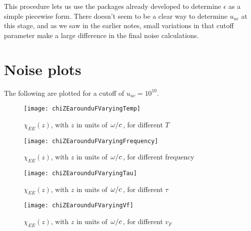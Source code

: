 \documentclass[11pt]{article}
\begin{document}
	This procedure lets us use the packages already developed to determine $\epsilon$ as a simple piecewise form.
	There doesn't seem to be a clear way to determine $u_{uc}$ at this stage, and as we saw in the earlier notes, small variations in that cutoff parameter make a large difference in the final noise calculations.

	\section{Noise plots} \label{sec:plots}

	The following are plotted for a cutoff of $u_{uc} = 10^{10}$.

	\begin{figure}[htp]
		\centering
		\texttt{[image: chiZEarounduFVaryingTemp]}
		\caption{$\chi_{EE}(z)$, with $z$ in units of $\flatfrac{\omega}{c}$, for different $T$} \label{fig:temp}
	\end{figure}

	\begin{figure}[htp]
		\centering
		\texttt{[image: chiZEarounduFVaryingFrequency]}
		\caption{$\chi_{EE}(z)$, with $z$ in units of $\flatfrac{\omega}{c}$, for different frequency} \label{fig:frequency}
	\end{figure}

	\begin{figure}[htp]
		\centering
		\texttt{[image: chiZEarounduFVaryingTau]}
		\caption{$\chi_{EE}(z)$, with $z$ in units of $\flatfrac{\omega}{c}$, for different $\tau$} \label{fig:tau}
	\end{figure}

	\begin{figure}[htp]
		\centering
		\texttt{[image: chiZEarounduFVaryingVf]}
		\caption{$\chi_{EE}(z)$, with $z$ in units of $\flatfrac{\omega}{c}$, for different $v_F$} \label{fig:vf}
	\end{figure}

	\newpage
	\listoftodos
	\newpage
	\printbibliography
\end{document}

